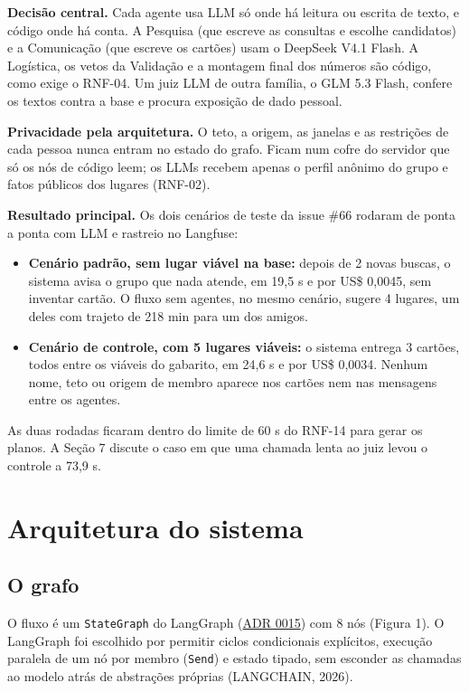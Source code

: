 \documentclass[12pt,a4paper]{article}
\begin{document}
\textbf{Decisão central.} Cada agente usa LLM só onde há leitura ou escrita de texto, e código onde há conta. A Pesquisa (que escreve as consultas e escolhe candidatos) e a Comunicação (que escreve os cartões) usam o DeepSeek V4.1 Flash. A Logística, os vetos da Validação e a montagem final dos números são código, como exige o RNF-04. Um juiz LLM de outra família, o GLM 5.3 Flash, confere os textos contra a base e procura exposição de dado pessoal.

\textbf{Privacidade pela arquitetura.} O teto, a origem, as janelas e as restrições de cada pessoa nunca entram no estado do grafo. Ficam num cofre do servidor que só os nós de código leem; os LLMs recebem apenas o perfil anônimo do grupo e fatos públicos dos lugares (RNF-02).

\textbf{Resultado principal.} Os dois cenários de teste da issue \#66 rodaram de ponta a ponta com LLM e rastreio no Langfuse:

\begin{itemize}
\item \textbf{Cenário padrão, sem lugar viável na base:} depois de 2 novas buscas, o sistema avisa o grupo que nada atende, em 19,5 s e por US\$ 0,0045, sem inventar cartão. O fluxo sem agentes, no mesmo cenário, sugere 4 lugares, um deles com trajeto de 218 min para um dos amigos.
\item \textbf{Cenário de controle, com 5 lugares viáveis:} o sistema entrega 3 cartões, todos entre os viáveis do gabarito, em 24,6 s e por US\$ 0,0034. Nenhum nome, teto ou origem de membro aparece nos cartões nem nas mensagens entre os agentes.
\end{itemize}

As duas rodadas ficaram dentro do limite de 60 s do RNF-14 para gerar os planos. A Seção 7 discute o caso em que uma chamada lenta ao juiz levou o controle a 73,9 s.


\section{Arquitetura do sistema}
\subsection{O grafo}
O fluxo é um \texttt{StateGraph} do LangGraph (\href{https://github.com/Residencia-IA-Challenge-2-Grupo-7/residencia-ia-g7-challenge2/blob/main/docs/decisoes/0015-orquestracao-com-langgraph.md}{ADR 0015}) com 8 nós (Figura 1). O LangGraph foi escolhido por permitir ciclos condicionais explícitos, execução paralela de um nó por membro (\texttt{Send}) e estado tipado, sem esconder as chamadas ao modelo atrás de abstrações próprias (LANGCHAIN, 2026).
\end{document}
